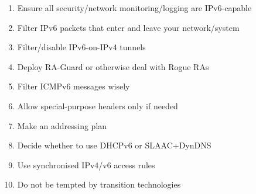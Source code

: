 
\begin{enumerate}
\item Ensure all security/network monitoring/logging are IPv6-capable
\item Filter IPv6 packets that enter and leave your network/system
\item Filter/disable IPv6-on-IPv4 tunnels
\item Deploy RA-Guard or otherwise deal with Rogue RAs
\item Filter ICMPv6 messages wisely
\item Allow special-purpose headers only if needed
\item Make an addressing plan
\item Decide whether to use DHCPv6 or SLAAC+DynDNS
\item Use synchronised IPv4/v6 access rules
\item Do not be tempted by transition technologies
\end{enumerate}
